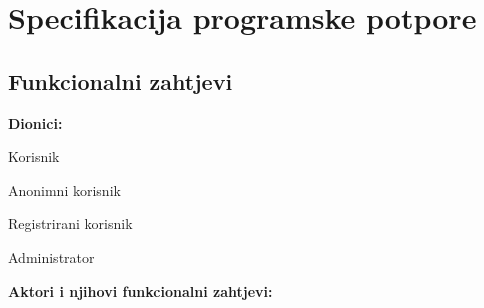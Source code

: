 \chapter{Specifikacija programske potpore}
		
	\section{Funkcionalni zahtjevi}			
			
			\noindent \textbf{Dionici:}
			
			\begin{packed_enum}
				
				\item Korisnik
				\begin{packed_enum}
					\item Anonimni korisnik
					\item Registrirani korisnik		
				\end{packed_enum}
				\item Administrator
				
			\end{packed_enum}
			
			\noindent \textbf{Aktori i njihovi funkcionalni zahtjevi:}
			
